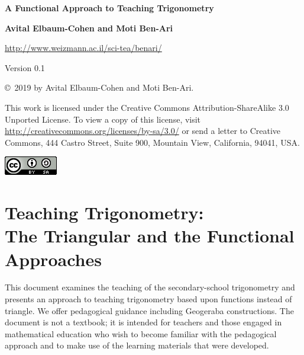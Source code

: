 
\thispagestyle{empty}

\begin{center}
\textbf{\LARGE A Functional Approach to Teaching Trigonometry}

\bigskip
\bigskip
\bigskip
\bigskip

\textbf{\Large Avital Elbaum-Cohen and Moti Ben-Ari}

\bigskip

\url{http://www.weizmann.ac.il/sci-tea/benari/}

\bigskip

Version 0.1

\end{center}


\vfill

\begin{footnotesize}
\begin{center}
\copyright{}\ 2019 by Avital Elbaum-Cohen and Moti Ben-Ari.
\end{center}

This work is licensed under the Creative Commons Attribution-ShareAlike 3.0 Unported License. To view a copy of this license, visit \url{http://creativecommons.org/licenses/by-sa/3.0/} or send a letter to Creative Commons, 444 Castro Street, Suite 900, Mountain View, California, 94041, USA.
\end{footnotesize}

\bigskip

\begin{center}
\includegraphics[width=.15\textwidth]{../../by-sa.png}
\end{center}

\newpage
\thispagestyle{empty}
\mbox{}
\newpage
\thispagestyle{empty}

\tableofcontents
\newpage
\mbox{}
\newpage

\chapter[Teaching Trigonometry: The Triangular and the Functional Approaches]{Teaching Trigonometry:\\The Triangular and the Functional Approaches}

This document examines the teaching of the secondary-school trigonometry and presents an approach to teaching trigonometry based upon functions instead of triangle.
We offer pedagogical guidance including Geogeraba constructions.
The document is not a textbook; it is intended for teachers and those engaged in mathematical education who wish to become familiar with the pedagogical approach and to make use of the learning materials that were developed.

